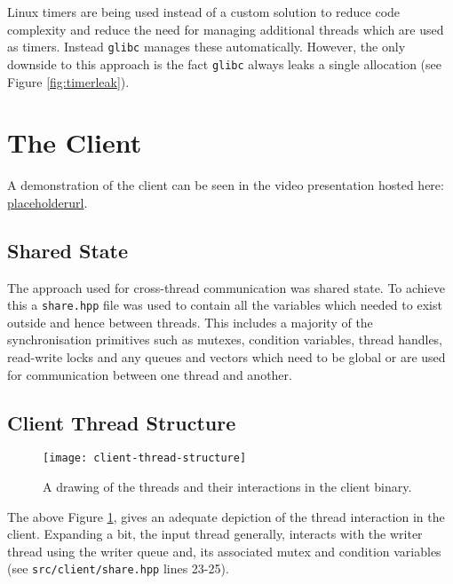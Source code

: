 \documentclass[article]{uom-coursework}
\begin{document}
\begin{note}
    Linux timers are being used instead of a custom solution to
    reduce code complexity and reduce the need for managing
    additional threads which are used as timers. Instead
    \texttt{glibc} manages these automatically. However, the
    only downside to this approach is the fact \texttt{glibc}
    always leaks a single allocation (see Figure
    \ref{fig:timerleak}).
\end{note}

\section{The Client}

\begin{note}
    A demonstration of the client can be seen in the video
    presentation hosted here: \url{placeholderurl}.
\end{note}

\subsection{Shared State}

The approach used for cross-thread communication was shared
state. To achieve this a \texttt{share.hpp} file was used to
contain all the variables which needed to exist outside and
hence between threads. This includes a majority of the
synchronisation primitives such as mutexes, condition variables,
thread handles, read-write locks and any queues and vectors
which need to be global or are used for communication between
one thread and another.

\subsection{Client Thread Structure}

\begin{figure}[H]
\centering
\begin{mdframed}[backgroundcolor=OffWhite]
\texttt{[image: client-thread-structure]}
\end{mdframed}
\caption{A drawing of the threads and their interactions in the
client binary.}
\label{fig:clientthreads}
\end{figure}

The above Figure \ref{fig:clientthreads}, gives an adequate
depiction of the thread interaction in the client. Expanding a
bit, the input thread generally, interacts with the writer
thread using the writer queue and, its associated mutex and
condition variables (see \texttt{src/client/share.hpp} lines
23-25).
\end{document}
